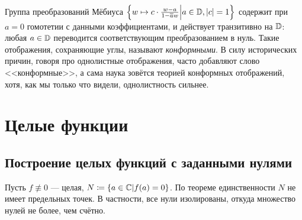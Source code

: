 \documentclass[a4paper]{report}
\begin{document}
    Группа преобразований Мёбиуса $\left\{w \mapsto c \cdot \frac{w - a}{1 - \overline{a}w}\middle|a \in \mathbb{D}, |c| = 1\right\}$ содержит при $a = 0$ гомотетии с данными коэффициентами, и действует транзитивно на $\mathbb{D}$: любая $a \in \mathbb{D}$ переводится соответствующим преобразованием в нуль.
    Такие отображения, сохраняющие углы, называют \emph{конформными}.
    В силу исторических причин, говоря про однолистные отображения, часто добавляют слово <<конформные>>, а сама наука зовётся теорией конформных отображений, хотя, как мы только что видели, однолистность сильнее.
    \section{Целые функции}
    \subsection{Построение целых функций с заданными нулями}
    Пусть $f \not\equiv 0$ --- целая, $N \coloneqq \left\{a \in \mathbb{C}\middle|f(a) = 0\right\}$.
    По теореме единственности $N$ не имеет предельных точек.
    В частности, все нули изолированы, откуда множество нулей не более, чем счётно.
\end{document}
